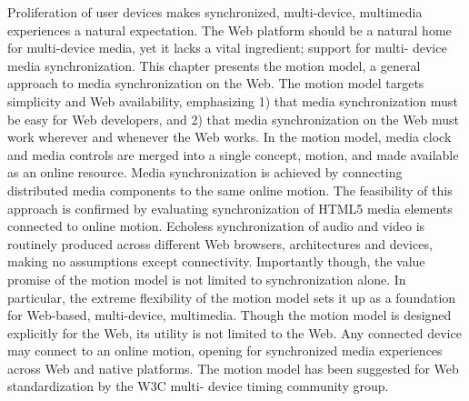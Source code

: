 Proliferation of user devices makes synchronized, multi-device, multimedia
experiences a natural expectation. The Web platform should be a natural home
for multi-device media, yet it lacks a vital ingredient; support for multi-
device media synchronization. This chapter presents the motion model, a
general approach to media synchronization on the Web. The motion model targets
simplicity and Web availability, emphasizing 1) that media synchronization
must be easy for Web developers, and 2) that media synchronization on the Web
must work wherever and whenever the Web works. In the motion model, media
clock and media controls are merged into a single concept, motion, and made
available as an online resource. Media synchronization is achieved by
connecting distributed media components to the same online motion. The
feasibility of this approach is confirmed by evaluating synchronization of
HTML5 media elements connected to online motion. Echoless synchronization of
audio and video is routinely produced across different Web browsers,
architectures and devices, making no assumptions except connectivity.
Importantly though, the value promise of the motion model is not limited to
synchronization alone. In particular, the extreme flexibility of the motion
model sets it up as a foundation for Web-based, multi-device, multimedia.
Though the motion model is designed explicitly for the Web, its utility is not
limited to the Web. Any connected device may connect to an online motion,
opening for synchronized media experiences across Web and native platforms.
The motion model has been suggested for Web standardization by the W3C multi-
device timing community group.
